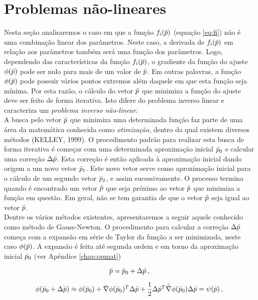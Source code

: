 \section{Problemas não-lineares}
\label{sec:nao-linear}

Nesta seção analisaremos o caso em que a função $f_i(\bar{p})$
(equação \ref{eq:fi}) não é uma combinação linear dos parâmetros.
Neste caso, a derivada de $f_i(\bar{p})$ em relação aos parâmetros também será
uma função dos parâmetros.
Logo, dependendo das características da função $f_i(\bar{p})$, o gradiente da
função do ajuste $\phi(\bar{p})$ pode ser nulo para mais de um valor de
$\bar{p}$.
Em outras palavras, a função $\phi(\bar{p})$ pode possuir
vários pontos extremos além daquele em que esta função seja mínima.
Por esta razão, o cálculo do vetor $\tilde{p}$ que minimiza a função do ajuste deve
ser feito de forma iterativa.
Isto difere do problema inverso linear e caracteriza um {\it problema inverso
não-linear}.
\\
\indent A busca pelo vetor $\tilde{p}$ que minimiza uma determinada função faz
parte de uma área da matemática conhecida como {\it otimização}, dentro da qual
existem diversos métodos (KELLEY, 1999).
O procedimento padrão para realizar esta busca de forma iterativa é começar com
uma determinada aproximação inicial $\bar{p}_0$ e calcular uma correção
$\Delta\bar{p}$.
Esta correção é então aplicada à aproximação inicial dando origem a um novo vetor
$\bar{p}_1$.
Este novo vetor serve como aproximação inicial para o cálculo de um segundo
vetor $\bar{p}_2$, e assim sucessivamente.
O processo termina quando é encontrado um vetor $\hat{p}$ que seja próximo ao
vetor $\tilde{p}$ que minimiza a função em questão.
Em geral, não se tem garantia de que o vetor $\hat{p}$ seja igual ao vetor
$\tilde{p}$.
\\
\indent Dentre os vários métodos existentes, apresentaremos a seguir aquele
conhecido como método de Gauss-Newton.
O procedimento para calcular a correção $\Delta\bar{p}$ começa com a
expansão em série de Taylor da função a ser minimizada, neste caso $\phi(\bar{p})$.
A expansão é feita até segunda ordem e em torno da aproximação inicial $\bar{p}_0$
(ver Apêndice \ref{chap:opmat})

\begin{equation}
\bar{p} =  \bar{p}_0 + \Delta\bar{p} \thinspace ,
\end{equation}

\begin{equation}
\phi(\bar{p}_0 + \Delta\bar{p}) \approx \phi(\bar{p}_0) +
    \bar{\nabla}\phi(\bar{p}_0)^T\Delta\bar{p} +
    \dfrac{1}{2}\Delta\bar{p}^T\bar{\bar{\nabla}}\phi(\bar{p}_0)\Delta\bar{p}
= \psi(\bar{p}) \thinspace ,
\label{eq:taylor}
\end{equation}

